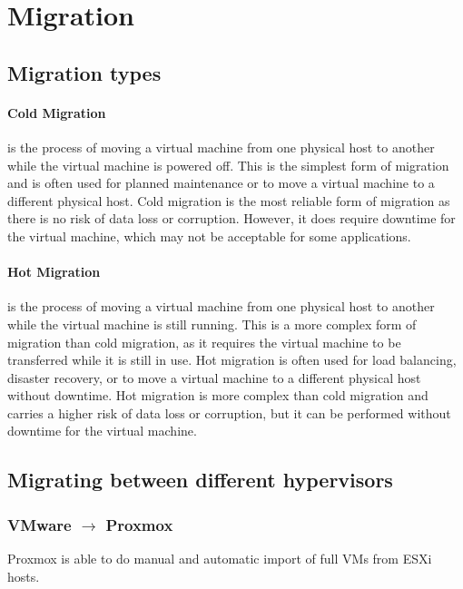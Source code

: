 \section{Migration}

\subsection{Migration types}

\paragraph{Cold Migration} is the process of moving a virtual machine from one physical host to another while the virtual machine is powered off. This is the simplest form of migration and is often used for planned maintenance or to move a virtual machine to a different physical host. Cold migration is the most reliable form of migration as there is no risk of data loss or corruption. However, it does require downtime for the virtual machine, which may not be acceptable for some applications.

\paragraph{Hot Migration} is the process of moving a virtual machine from one physical host to another while the virtual machine is still running. This is a more complex form of migration than cold migration, as it requires the virtual machine to be transferred while it is still in use. Hot migration is often used for load balancing, disaster recovery, or to move a virtual machine to a different physical host without downtime. Hot migration is more complex than cold migration and carries a higher risk of data loss or corruption, but it can be performed without downtime for the virtual machine.




\subsection{Migrating between different hypervisors}

\subsubsection{VMware $\rightarrow$ Proxmox}
Proxmox is able to do manual and automatic import of full VMs from ESXi hosts.

